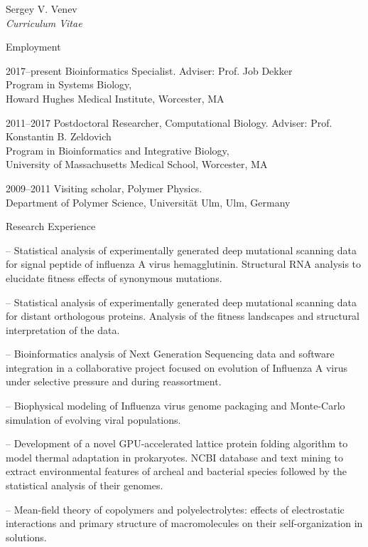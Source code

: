\documentclass[10pt]{article}
\begin{document}
\begin{cv}{Sergey V. Venev\\{\large \itshape Curriculum Vitae}}
\begin{cvlist}{Employment}
    \item[2017--present] Bioinformatics Specialist. Adviser: Prof. Job Dekker\\
    Program in Systems Biology,\\ Howard Hughes Medical Institute,
    Worcester, MA   
    \item[2011--2017] Postdoctoral Researcher, Computational Biology. Adviser: Prof. Konstantin B. Zeldovich\\
    Program in Bioinformatics and Integrative Biology,\\ University of Massachusetts Medical School,
    Worcester, MA   
    \item[2009--2011] Visiting scholar, Polymer Physics. \\
    Department of Polymer Science, Universit{\"a}t Ulm,
    Ulm, Germany  
\end{cvlist}



\setlength{\oldcvlabelwidth}{\cvlabelwidth}
\setlength{\cvlabelwidth}{1em}
\begin{cvlist}{Research Experience}
    \item[--] Statistical analysis of experimentally generated deep mutational scanning data for signal peptide of influenza A virus hemagglutinin. Structural RNA analysis to elucidate fitness effects of synonymous mutations.
    \item[--] Statistical analysis of experimentally generated deep mutational scanning data for distant orthologous proteins. Analysis of the fitness landscapes and structural interpretation of the data.
    \item[--] Bioinformatics analysis of Next Generation Sequencing data and software integration in a collaborative project focused on evolution of Influenza A virus under selective pressure and during reassortment.
    \item[--] Biophysical modeling of Influenza virus genome packaging and Monte-Carlo simulation of evolving viral populations.
    \item[--] Development of a novel GPU-accelerated lattice protein folding algorithm to model thermal adaptation in prokaryotes. NCBI database and text mining to extract environmental features of archeal and bacterial species followed by the statistical analysis of their genomes.
    \item[--] Mean-field theory of copolymers and polyelectrolytes: effects of electrostatic interactions and primary structure of macromolecules on their self-organization in solutions.


\end{cvlist}
\end{cv}
\end{document}
